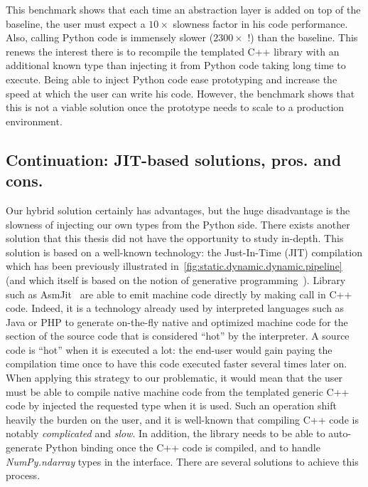 This benchmark shows that each time an abstraction layer is added on top of the baseline, the user must expect a
\(10\times\) slowness factor in his code performance. Also, calling Python code is immensely slower (\(2300\times\) !)
than the baseline. This renews the interest there is to recompile the templated C++ library with an additional known
type than injecting it from Python code taking long time to execute. Being able to inject Python code ease prototyping
and increase the speed at which the user can write his code. However, the benchmark shows that this is not a viable
solution once the prototype needs to scale to a production environment.


\subsection{Continuation: JIT-based solutions, pros. and cons.}

Our hybrid solution certainly has advantages, but the huge disadvantage is the slowness of injecting our own types from
the Python side. There exists another solution that this thesis did not have the opportunity to study in-depth. This
solution is based on a well-known technology: the Just-In-Time (JIT) compilation which has been previously illustrated
in~\cref{fig:static.dynamic.dynamic.pipeline} (and which itself is based on the notion of generative
programming~\parencite{czarnecki.2000.generative}). Library such as AsmJit~\parencite{kobalicek.2011.asmjit} are able to
emit machine code directly by making call in C++ code. Indeed, it is a technology already used by interpreted languages
such as Java or PHP to generate on-the-fly native and optimized machine code for the section of the source code that is
considered ``hot'' by the interpreter. A source code is ``hot'' when it is executed a lot: the end-user would gain
paying the compilation time once to have this code executed faster several times later on. When applying this strategy
to our problematic, it would mean that the user must be able to compile native machine code from the templated generic
C++ code by injected the requested type when it is used. Such an operation shift heavily the burden on the user, and it
is well-known that compiling C++ code is notably \emph{complicated} and \emph{slow}. In addition, the library needs to
be able to auto-generate Python binding once the C++ code is compiled, and to handle \emph{NumPy.ndarray} types in the
interface. There are several solutions to achieve this process.

